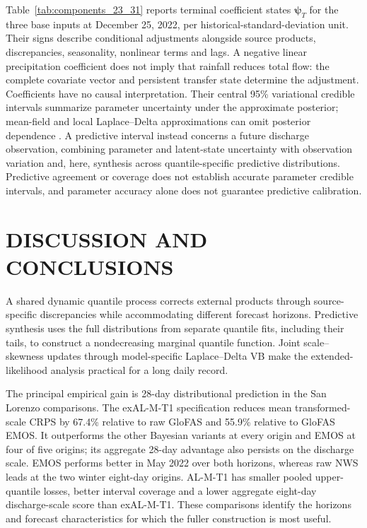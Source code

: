 \documentclass[APA,STIX1COL]{WileyNJD-v2}
\begin{document}
Table~\ref{tab:components_23_31} reports terminal coefficient states $\boldsymbol\psi_T$ for the three base inputs at December 25, 2022, per historical-standard-deviation unit. Their signs describe conditional adjustments alongside source products, discrepancies, seasonality, nonlinear terms and lags. A negative linear precipitation coefficient does not imply that rainfall reduces total flow: the complete covariate vector and persistent transfer state determine the adjustment. Coefficients have no causal interpretation. Their central 95\% variational credible intervals summarize parameter uncertainty under the approximate posterior; mean-field and local Laplace--Delta approximations can omit posterior dependence \citep{blei2017variational}. A predictive interval instead concerns a future discharge observation, combining parameter and latent-state uncertainty with observation variation and, here, synthesis across quantile-specific predictive distributions. Predictive agreement or coverage does not establish accurate parameter credible intervals, and parameter accuracy alone does not guarantee predictive calibration.

\section{DISCUSSION AND CONCLUSIONS}
\label{sec5}

A shared dynamic quantile process corrects external products through source-specific discrepancies while accommodating different forecast horizons. Predictive synthesis uses the full distributions from separate quantile fits, including their tails, to construct a nondecreasing marginal quantile function. Joint scale--skewness updates through model-specific Laplace--Delta VB make the extended-likelihood analysis practical for a long daily record.

The principal empirical gain is 28-day distributional prediction in the San Lorenzo comparisons. The exAL-M-T1 specification reduces mean transformed-scale CRPS by 67.4\% relative to raw GloFAS and 55.9\% relative to GloFAS EMOS. It outperforms the other Bayesian variants at every origin and EMOS at four of five origins; its aggregate 28-day advantage also persists on the discharge scale. EMOS performs better in May 2022 over both horizons, whereas raw NWS leads at the two winter eight-day origins. AL-M-T1 has smaller pooled upper-quantile losses, better interval coverage and a lower aggregate eight-day discharge-scale score than exAL-M-T1. These comparisons identify the horizons and forecast characteristics for which the fuller construction is most useful.
\end{document}
